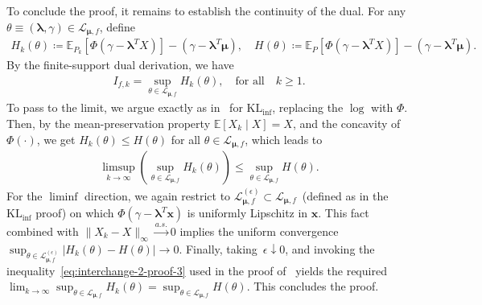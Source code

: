 \documentclass{article}
\theoremstyle{plain}
\theoremstyle{definition}
\newcommand{\lrp}[1]{\left( #1 \right)}
\newcommand{\KLinf}{\operatorname{KL_{inf}}}
\newcommand{\calL}{\mathcal L}
\newcommand{\xvec}{\mathbf{x}}
\newcommand{\qtext}[1]{\quad \text{#1} \quad}
\newcommand{\boldlambda}{\boldsymbol{\lambda}}
\newcommand{\boldmu}{\boldsymbol{\mu}}
\newcommand{\fdivdualdomain}{\calL_{\boldmu, f}}
\newcommand{\epsfdivdualdomain}{\calL_{\boldmu, f}^{(\epsilon)}}
\begin{document}
To conclude the proof, it remains to establish the continuity of the dual. For any $\theta \equiv (\boldlambda, \gamma) \in \fdivdualdomain$, define 
\begin{align}
    H_k(\theta) \coloneqq \mathbb{E}_{P_k}[\Phi(\gamma - \boldlambda^T X)] - (\gamma - \boldlambda^T \boldmu), \quad 
    H(\theta) \coloneqq \mathbb{E}_{P}[\Phi(\gamma - \boldlambda^T X)] - (\gamma - \boldlambda^T \boldmu). 
\end{align}
By the finite-support dual derivation, we have 
\begin{align}
    I_{f,k} = \sup_{\theta \in \fdivdualdomain} H_k(\theta), \qtext{for all} k \geq1. 
\end{align}
To pass to the limit, we argue exactly as in~ for $\KLinf$, replacing the $\log$ with $\Phi$. Then, by the mean-preservation property $\mathbb{E}[X_k \mid X] = X$, and the concavity of $\Phi(\cdot)$, we get $H_k(\theta) \leq H(\theta)$ for all $\theta \in \fdivdualdomain$, which leads to 
\begin{align}
    \limsup_{k \to \infty} \lrp{ \sup_{\theta \in \fdivdualdomain} H_k(\theta) } \leq \sup_{\theta \in \fdivdualdomain} H(\theta). 
\end{align}
For the $\liminf$ direction, we again restrict to $\epsfdivdualdomain \subset \fdivdualdomain$~(defined as in the $\KLinf$ proof) on which $\Phi(\gamma - \boldlambda^T \xvec)$ is uniformly Lipschitz in $\xvec$. This fact combined with $\|X_k - X\|_\infty \overset{a.s.}{\longrightarrow} 0$ implies the uniform convergence $\sup_{\theta \in \epsfdivdualdomain} \left\lvert H_k(\theta) - H(\theta) \right\rvert \to 0$. Finally, taking~$\epsilon \downarrow 0$, and invoking the inequality~\eqref{eq:interchange-2-proof-3} used in the proof of~ yields the required $\lim_{k \to \infty} \sup_{\theta \in \fdivdualdomain} H_k(\theta) = \sup_{\theta \in \fdivdualdomain} H(\theta)$. This concludes the proof.  




















    
    
\end{document}

